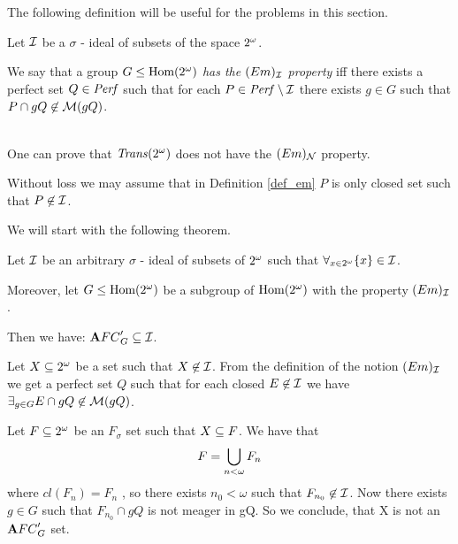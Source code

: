 
The following definition will be useful for the problems in this section.

\begin{definition}
\label{def_em}
Let ${\cal I}$ be a $\sigma$ - ideal of subsets of the space $2^{\omega}$.

We say that a group $G \leq {\rm Hom(2^{\omega})}$ {\it has the $(Em)_{{\cal I}}$ property}\/
iff there exists a perfect set $Q \in {\it Perf}$
such that for each
$P\in {\it Perf} \setminus {\cal I}$
there exists $g \in G$ such that
$P \cap gQ \not\in {\cal M}(gQ)$.
\end{definition}

 \\

One can prove that ${\it Trans}(2^{\omega})$ does not have the $(Em)_{{\cal N}}$ property.

Without loss we may assume that in Definition \ref{def_em}
$P$ is only closed set such that $P \not\in {\cal I}$.

We will start with the following theorem.

\begin{theorem}
\label{em=>afcg->i}
  Let ${\cal I}$ be an arbitrary $\sigma$ - ideal of subsets of $2^{\omega}$
such that $\forall_{x\in2^{\omega}} \lbrace x \rbrace \in {\cal I}$.

  Moreover, let $G \leq {\rm Hom(2^{\omega})}$
be a subgroup of ${\rm Hom(2^{\omega})}$ with the property $(Em)_{{\cal I}}$.

  Then we have:
${\mathbf AFC}^\prime_{G} \subseteq {\cal I}$.
\end{theorem}

\proof

Let $X \subseteq 2^{\omega}$ be a set such that $X \not\in {\cal I}$.
From the definition of
the notion $(Em)_{{\cal I}}$ we get a perfect set $Q$ such that
for each closed $E \not\in {\cal I}$ we have
$\exists_{g \in G} E \cap gQ \not\in {\cal M}(gQ)$.

Let $F \subseteq 2^{\omega}$ be an $F_{\sigma}$ set
such that $X \subseteq F$.
We have that
$$F = \bigcup_{ n < \omega } F_n$$
where $cl(F_n) = F_n$ , so there exists $n_0 < \omega$
such that $F_{n_0} \not\in {\cal I}$.
Now there exists $g \in G$
such that $F_{n_0} \cap gQ$
is not meager in gQ.
So we conclude, that X is not an ${\mathbf AFC}^\prime_{G}$ set.

